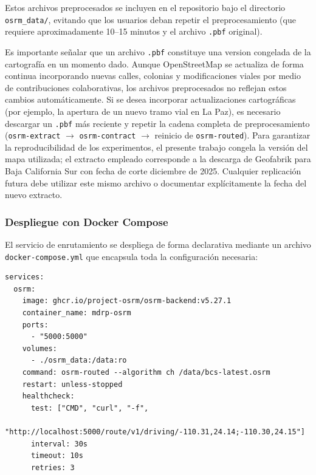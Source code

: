 \documentclass[12pt,letterpaper,oneside]{book}
\begin{document}
	Estos archivos preprocesados se incluyen en el repositorio bajo el directorio \texttt{osrm\_data/}, 
	evitando que los usuarios deban repetir el preprocesamiento (que requiere aproximadamente 10--15 minutos 
	y el archivo \texttt{.pbf} original).

	Es importante señalar que un archivo \texttt{.pbf} constituye una version congelada
	de la cartografía en un momento dado. Aunque OpenStreetMap se actualiza de forma continua incorporando 
	nuevas calles, colonias y modificaciones viales por medio de contribuciones colaborativas, los archivos 
	preprocesados no reflejan estos cambios automáticamente. Si se desea incorporar actualizaciones 
	cartográficas (por ejemplo, la apertura de un nuevo tramo vial en La Paz), es necesario descargar un 
	\texttt{.pbf} más reciente y repetir la cadena completa de preprocesamiento 
	(\texttt{osrm-extract} $\rightarrow$ \texttt{osrm-contract} $\rightarrow$ reinicio de 
	\texttt{osrm-routed}). Para garantizar la reproducibilidad de los experimentos, el presente trabajo 
	congela la versión del mapa utilizada; el extracto empleado corresponde a la descarga de Geofabrik 
	para Baja California Sur con fecha de corte diciembre de 2025. Cualquier replicación futura debe 
	utilizar este mismo archivo o documentar explícitamente la fecha del nuevo extracto.

	\subsubsection{Despliegue con Docker Compose}

	El servicio de enrutamiento se despliega de forma declarativa mediante un archivo 
	\texttt{docker-compose.yml} que encapsula toda la configuración necesaria:

	\begin{lstlisting}[basicstyle=\ttfamily\footnotesize, frame=single,
	breaklines=true, breakatwhitespace=true, columns=fullflexible,
	caption={Definición del servicio OSRM en \texttt{docker-compose.yml}.},
	label=lst:dockercompose]
services:
  osrm:
    image: ghcr.io/project-osrm/osrm-backend:v5.27.1
    container_name: mdrp-osrm
    ports:
      - "5000:5000"
    volumes:
      - ./osrm_data:/data:ro
    command: osrm-routed --algorithm ch /data/bcs-latest.osrm
    restart: unless-stopped
    healthcheck:
      test: ["CMD", "curl", "-f",
             "http://localhost:5000/route/v1/driving/-110.31,24.14;-110.30,24.15"]
      interval: 30s
      timeout: 10s
      retries: 3
	\end{lstlisting}
\end{document}
